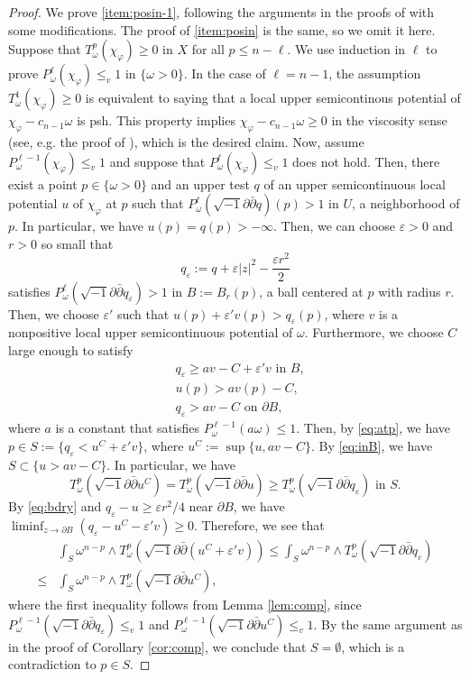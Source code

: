 \documentclass[10pt,a4paper]{amsart}
\numberwithin{equation}{section}
\newcommand{\delb}{\sqrt{-1}\partial\bar{\partial}}
\begin{document}
\begin{proof}
    We prove \ref{item:posin-1}, following the arguments in the proofs of \cite[Propositions 1.5 and 1.11]{EGZ} with some modifications. The proof of \ref{item:posin} is the same, so we omit it here. Suppose that $T^p_\omega(\chi_\varphi)\ge0$ in $X$ for all $p\le n-\ell$. 
    We use induction in $\ell$ to prove $P^\ell_\omega(\chi_\varphi)\le_v1$ in $\{\omega>0\}$. In the case of $\ell=n-1$, the assumption $T^1_\omega(\chi_\varphi)\ge0$ is equivalent to saying that a local upper semicontinous potential of $\chi_\varphi-c_{n-1}\omega$ is psh. This property implies $\chi_\varphi-c_{n-1}\omega\ge0$ in the viscosity sense (see, e.g. the proof of \cite[Proposition 1.3]{EGZ}), which is the desired claim.
    Now, assume $P^{\ell-1}_\omega(\chi_\varphi)\le_v1$ and suppose that $P^\ell_\omega(\chi_\varphi)\le_v1$ does not hold. Then, there exist a point $p\in\{\omega>0\}$ and an upper test $q$ of an upper semicontinuous local potential $u$ of $\chi_\varphi$ at $p$ such that $P^\ell_\omega(\delb q)(p)>1$ in $U$, a neighborhood of $p$. In particular, we have $u(p)=q(p)>-\infty$.
    Then, we can choose $\varepsilon>0$ and $r>0$ so small that 
    $$q_\varepsilon:=q+\varepsilon\vert z\vert^2-\frac{\varepsilon r^2}{2}$$
    satisfies $P^\ell_\omega(\delb q_\varepsilon)>1$ in $B:=B_{r}(p)$, a ball centered at $p$ with radius $r$. Then, we choose $\varepsilon'$ such that $u(p)+\varepsilon'v(p)>q_\varepsilon(p)$, where $v$ is a nonpositive local upper semicontinuous potential of $\omega$. 
    Furthermore, we choose $C$ large enough to satisfy
    \begin{align}
        &\label{eq:inB} q_\varepsilon\ge av-C+\varepsilon'v \text{ in } B,\\
        &\label{eq:atp} u(p)>av(p)-C,\\
        &\label{eq:bdry}q_\varepsilon> av-C \text{ on }\partial B,
    \end{align}
    where $a$ is a constant that satisfies $P^{\ell-1}_\omega(a\omega)\le1$.
    Then, by \eqref{eq:atp}, we have $p\in S:=\{q_\varepsilon<u^C+\varepsilon'v\}$, where $u^C:=\sup\{u,av-C\}$. By \eqref{eq:inB}, we have $S\subset\{u>av-C\}$. In particular, we have $$T^p_\omega(\delb u^C)=T^p_\omega(\delb u)\ge T^p_\omega(\delb q_\varepsilon) \text{ in } S.$$ By \eqref{eq:bdry} and $q_\varepsilon-u\ge \varepsilon r^2/4$ near $\partial B$, we have $\liminf_{z\to\partial B}(q_\varepsilon-u^C-\varepsilon'v)\ge0$. Therefore, we see that 
    \begin{equation*}
        \begin{aligned}
            &\int_S \omega^{n-p}\wedge T^p_\omega(\delb (u^C+\varepsilon' v))\le\int_S \omega^{n-p}\wedge T^p_\omega(\delb q_\varepsilon)\\
            \le&\int_{S}\omega^{n-p}\wedge T^p_\omega(\delb u^C),      
        \end{aligned}
    \end{equation*}
    where the first inequality follows from Lemma \ref{lem:comp}, since $P^{\ell-1}_\omega(\delb q_\varepsilon)\le_v1$ and $P^{\ell-1}_\omega(\delb u^C)\le_v1$. By the same argument as in the proof of Corollary \ref{cor:comp}, we conclude that $S=\emptyset$, which is a contradiction to $p\in S$. 
\end{proof}
\end{document}
